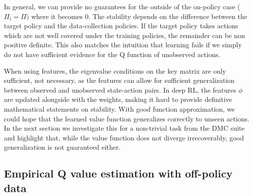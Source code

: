 In general, we can provide no guarantees for the  outside of the on-policy case ($\Pi_i = \Pi)$ where it becomes $0$.
The stability depends on the difference between the target policy and the data-collection policies.
If the target policy takes actions which are not well covered under the training policies, the remainder can be non positive definite.
This also matches the intuition that learning fails if we simply do not have sufficient evidence for the Q function of unobserved actions.

When using features, the eigenvalue conditions on the key matrix are only sufficient, not necessary, as the features can allow for sufficient generalization between observed and unobserved state-action pairs.
In deep RL, the features $\phi$ are updated alongside with the weights, making it hard to provide definitive mathematical statements on stability.
With good function approximation, we could hope that the learned value function generalizes correctly to unseen actions.
In the next section we investigate this for a non-trivial task from the DMC suite and highlight that, while the value function does not diverge irrecoverably, good generalization is not guaranteed either. %

\subsection{Empirical Q value estimation with off-policy data}
\label{sec:mad:off-policy-eval-exp}

